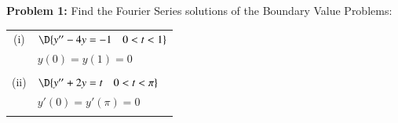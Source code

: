 \documentclass[11pt]{article}
\begin{document}


\vspace{0.2cm}

{\bf Problem 1:} Find the Fourier Series solutions of the Boundary Value Problems:

\setlength{\extrarowheight}{0.1cm}
\begin{tabular}{cl}
	(i)   & $\D{y''-4y=-1 \quad 0<t<1}$ \\
	      & $y(0)=y(1)=0$\\ 
	      & \\
	(ii) & $\D{y''+2y=t \quad 0<t<\pi}$ \\
	      & $y'(0)=y'(\pi)=0$\\ 
	      & \\
\end{tabular}
\end{document}
